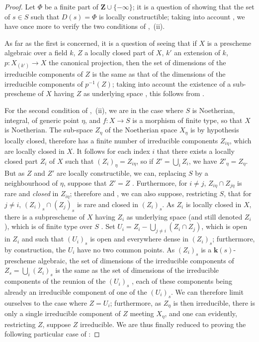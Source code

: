 \begin{proof}
Let $\Phi$ be a finite part of $\mathbf{Z}\cup\{-\infty\}$; it is a question of showing that the set of $s\in S$ such that $D(s)=\Phi$ is locally constructible; taking into account , we have once more to verify the two conditions of ,~(ii).

As far as the first is concerned, it is a question of seeing that if $X$ is a prescheme algebraic over a field $k$, $Z$ a locally closed part of $X$, $k'$ an extension of $k$, $p:X_{(k')}\to X$ the canonical projection, then the set of dimensions of the irreducible components of $Z$ is the same as that of the dimensions of the irreducible components of $p^{-1}(Z)$; taking into account the existence of a sub-prescheme of $X$ having $Z$ as underlying space , this follows from .

For the second condition of ,~(ii), we are in the case where $S$ is Noetherian, integral, of generic point $\eta$, and $f:X\to S$ is a morphism of finite type, so that $X$ is Noetherian.
The sub-space $Z_\eta$ of the Noetherian space $X_\eta$ is by hypothesis locally closed, therefore has a finite number of irreducible components $Z_{i\eta}$, which are locally closed in $X$.
It follows for each index $i$ that there exists a locally closed part $Z_i$ of $X$ such that $(Z_i)_\eta=Z_{i\eta}$, so if $Z'=\bigcup_i Z_i$, we have $Z'_\eta=Z_\eta$.
But as $Z$ and $Z'$ are locally constructible, we can, replacing $S$ by a neighbourhood of $\eta$, suppose that $Z'=Z$ .
Furthermore, for $i\neq j$, $Z_{i\eta}\cap Z_{j\eta}$ is rare and \emph{closed} in $Z_{i\eta}$; therefore  and , we can also suppose, restricting $S$, that for $j\neq i$, $(Z_i)_s\cap(Z_j)_s$ is rare and closed in $(Z_i)_s$.
As $Z_i$ is locally closed in $X$, there is a subprescheme of $X$ having $Z_i$ as underlying space (and still denoted $Z_i$), which is of finite type over $S$ .
Set $U_i=Z_i-\bigcup_{j\neq i}(Z_i\cap Z_j)$, which is open in $Z_i$ and such that $(U_i)_s$ is open and everywhere dense in $(Z_i)_s$; furthermore, by construction, the $U_i$ have no two common points.
As $(Z_i)_s$ is a $\boldsymbol{k}(s)$-prescheme algebraic, the set of dimensions of the irreducible components of $Z_s=\bigcup_i(Z_i)_s$ is the same as the set of dimensions of the irreducible components of the reunion of the $(U_i)_s$ , each of these components being already an irreducible component of one of the $(U_i)_s$.
We can therefore limit ourselves to the case where $Z=U_i$; furthermore, as $Z_\eta$ is then irreducible, there is only a single irreducible component of $Z$ meeting $X_\eta$, and one can evidently, restricting $Z$, suppose $Z$ irreducible.
We are thus finally reduced to proving the following particular case of :
\end{proof}

